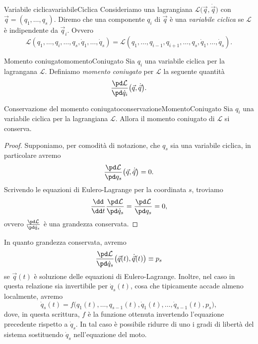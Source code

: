 \begin{defn}{Variabile ciclica}{variabileCiclica}
	Consideriamo una lagrangiana \(\mathcal{L}\big(\vec{q},\dot{\vec{q}}\big)\) con \(\vec{q}=(q_1,\ldots,q_s)\). Diremo che una componente \(q_i\) di \(\vec{q}\) è una \emph{variabile ciclica} se \(\mathcal{L}\) è indipendente da \(\vec{q}_i\). Ovvero
	\[
		\mathcal{L}(q_1,\ldots,q_i,\ldots,q_s,\dot{q}_1,\ldots,\dot{q}_s) = \mathcal{L}(q_1,\ldots,q_{i-1},q_{i+1},\ldots,q_s,\dot{q}_1,\ldots,\dot{q}_s).
	\]
\end{defn}

\begin{defn}{Momento coniugato}{momentoConiugato}
	Sia \(q_i\) una variabile ciclica per la lagrangana \(\mathcal{L}\). Definiamo \emph{momento coniugato} per \(\mathcal{L}\) la seguente quantità
	\[
		\frac{\pd\mathcal{L}}{\pd\dot{q}_i}\big(\vec{q},\dot{\vec{q}}\big).
	\]
\end{defn}

\begin{prop}{Conservazione del momento coniugato}{conservazioneMomentoConiugato}
	Sia \(q_i\) una variabile ciclica per la lagrangiana \(\mathcal{L}\). Allora il momento coniugato di \(\mathcal{L}\) si conserva.
\end{prop}

\begin{proof}
	Supponiamo, per comodità di notazione, che \(q_s\) sia una variabile ciclica, in particolare avremo
	\[
		\frac{\pd\mathcal{L}}{\pd q_s}\big(\vec{q},\dot{\vec{q}}\big) = 0.
	\]
	Scrivendo le equazioni di Eulero-Lagrange per la coordinata \(s\), troviamo
	\[
		\frac{\dd}{\dd t}\frac{\pd\mathcal{L}}{\pd\dot{q}_s} = \frac{\pd\mathcal{L}}{\pd q_s} = 0,
	\]
	ovvero \(\frac{\pd\mathcal{L}}{\pd\dot{q}_s}\) è una grandezza conservata.
\end{proof}

\begin{oss}
	In quanto grandezza conservata, avremo
	\[
		\frac{\pd\mathcal{L}}{\pd\dot{q}_s}\big(\vec{q}(t),\dot{\vec{q}}(t)\big) \equiv p_s
	\]
	se \(\vec{q}(t)\) è soluzione delle equazioni di Eulero-Lagrange.
	Inoltre, nel caso in questa relazione sia invertibile per \(\dot{q}_s(t)\), cosa che tipicamente accade almeno localmente, avremo
	\[
		\dot{q}_s(t) = f\big(q_1(t),\ldots,q_{s-1}(t),\dot{q}_1(t),\ldots,\dot{q}_{s-1}(t),p_s\big),
	\]
	dove, in questa scrittura, \(f\) è la funzione ottenuta invertendo l'equazione precedente rispetto a \(\dot{q}_s\).
	In tal caso è possibile ridurre di uno i gradi di libertà del sistema sostituendo \(\dot{q}_s\) nell'equazione del moto.
\end{oss}

